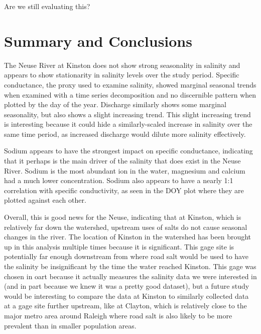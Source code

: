 \documentclass[
  12pt,
]{article}
\begin{document}
Are we still evaluating this?

\newpage

\hypertarget{summary-and-conclusions}{%
\section{Summary and Conclusions}\label{summary-and-conclusions}}

The Neuse River at Kinston does not show strong seasonality in salinity
and appears to show stationarity in salinity levels over the study
period. Specific conductance, the proxy used to examine salinity, showed
marginal seasonal trends when examined with a time series decomposition
and no discernible pattern when plotted by the day of the year.
Discharge similarly shows some marginal seasonality, but also shows a
slight increasing trend. This slight increasing trend is interesting
because it could hide a similarly-scaled increase in salinity over the
same time period, as increased discharge would dilute more salinity
effectively.

Sodium appears to have the strongest impact on specific conductance,
indicating that it perhaps is the main driver of the salinity that does
exist in the Neuse River. Sodium is the most abundant ion in the water,
magnesium and calcium had a much lower concentration. Sodium also
appears to have a nearly 1:1 correlation with specific conductivity, as
seen in the DOY plot where they are plotted against each other.

Overall, this is good news for the Neuse, indicating that at Kinston,
which is relatively far down the watershed, upstream uses of salts do
not cause seasonal changes in the river. The location of Kinston in the
watershed has been brought up in this analysis multiple times because it
is significant. This gage site is potentially far enough downstream from
where road salt would be used to have the salinity be insignificant by
the time the water reached Kinston. This gage was chosen in oart because
it actually measures the salinity data we were interested in (and in
part because we knew it was a pretty good dataset), but a future study
would be interesting to compare the data at Kinston to similarly
collected data at a gage site further upstream, like at Clayton, which
is relatively close to the major metro area around Raleigh where road
salt is also likely to be more prevalent than in smaller population
areas.
\end{document}
